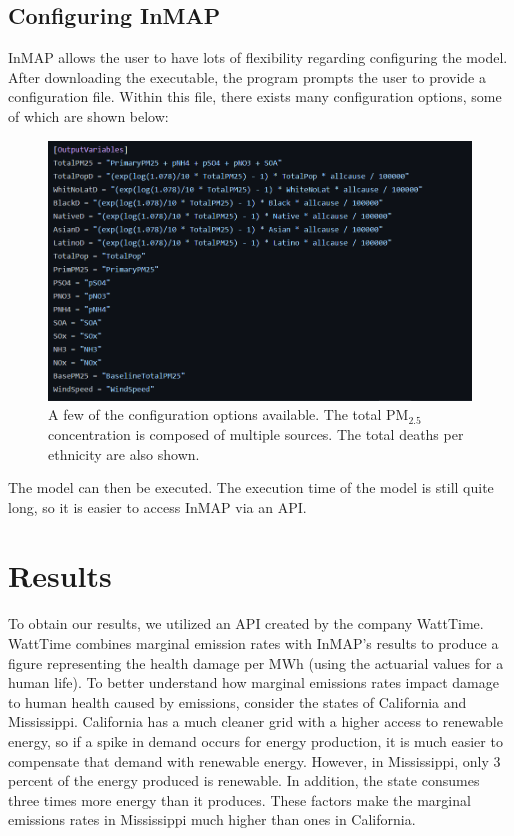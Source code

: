 \documentclass{article}
\begin{document}
\subsection{Configuring InMAP}

InMAP allows the user to have lots of flexibility regarding configuring the model. After downloading the executable,
the program prompts the user to provide a configuration file. Within this file, there exists many configuration options,
some of which are shown below:

\begin{figure}[h]
    \centering
    \includegraphics[width=\textwidth]{code.png}
    \caption{A few of the configuration options available. The total $\text{PM}_{2.5}$ concentration is composed of multiple
    sources. The total deaths per ethnicity are also shown.}
    \label{fig:grid3}
 \end{figure}

The model can then be executed. The execution time of the model is still quite long, so it is easier to access InMAP via an API.

\section{Results}

To obtain our results, we utilized an API created by the company WattTime. WattTime combines marginal emission rates with InMAP's results
to produce a figure representing the health damage per MWh (using the actuarial values for a human life). To better understand how marginal emissions rates impact damage to human health caused
by emissions, consider the states of California and Mississippi. California has a much cleaner grid with a higher access to renewable energy, 
so if a spike in demand occurs for energy production, it is much easier to compensate that demand with renewable energy. However,
in Mississippi, only 3 percent of the energy produced is renewable. In addition, the state consumes three times more energy than it produces.
These factors make the marginal emissions rates in Mississippi much higher than ones in California. 
\end{document}
